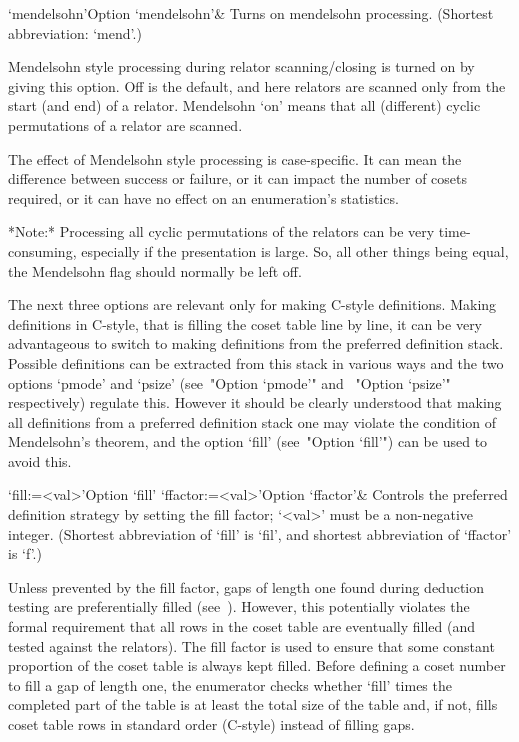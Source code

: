 \>`mendelsohn'{Option `mendelsohn'}&
Turns on mendelsohn processing. (Shortest abbreviation: `mend'.)

Mendelsohn style processing during relator scanning/closing is  turned
on by giving this option. Off is the default, and  here  relators  are
scanned only from  the  start  (and  end)  of  a  relator.  Mendelsohn
\lq{}on' means that all (different) cyclic permutations of  a  relator
are scanned.

The effect  of Mendelsohn style  processing is case-specific.   It can
mean the difference  between success or failure, or  it can impact the
number  of  cosets   required,  or  it  can  have   no  effect  on  an
enumeration's statistics.

*Note:* Processing all cyclic permutations of the relators can be very
time-consuming,  especially if  the  presentation is  large.  So,  all
other things being equal, the  Mendelsohn flag should normally be left
off.


The  next  three  options  are  relevant  only  for   making   C-style
definitions. Making definitions in C-style, that is filling the  coset
table line by line, it can be very advantageous to  switch  to  making
definitions from the preferred definition stack. Possible  definitions
can be extracted from this stack in various ways and the  two  options
`pmode'  and  `psize'  (see~"Option  `pmode'"  and  ~"Option  `psize'"
respectively) regulate this. However it should be  clearly  understood
that making all definitions from a preferred definition stack one  may
violate the condition of Mendelsohn's theorem, and the  option  `fill'
(see~"Option `fill'") can be used to avoid this.

\>`fill:=<val>'{Option `fill'}
\>`ffactor:=<val>'{Option `ffactor'}&
Controls the preferred definition strategy by setting the fill factor;
`<val>' must be a non-negative integer.
(Shortest abbreviation of `fill' is `fil', and  shortest  abbreviation
of `ffactor' is `f'.)

Unless prevented by  the fill factor, gaps of  length one found during
deduction   testing  are  preferentially   filled  (see~\cite{Hav91}).
However,  this potentially  violates the  formal requirement  that all
rows in the coset table  are eventually filled (and tested against the
relators).   The fill  factor is  used  to ensure  that some  constant
proportion of the coset table  is always kept filled.  Before defining
a coset  number to  fill a  gap of length  one, the  enumerator checks
whether `fill' times  the completed part of the table  is at least the
total  size of  the  table and,  if  not, fills  coset  table rows  in
standard order (C-style) instead of filling gaps.

